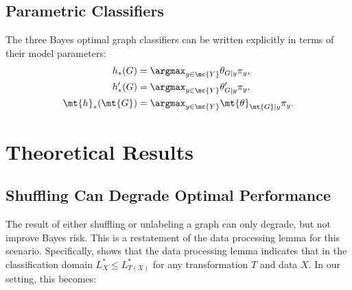\documentclass[10pt,journal,cspaper,compsoc]{IEEEtran}
\begin{document}

\subsection{Parametric Classifiers} %
\label{sub:parametric_classifiers}


The three Bayes optimal graph classifiers can be written explicitly in terms of their model parameters:
\begin{align}
	h_*(G) &= \argmax_{y \in \mc{Y}} \theta_{G|y}\pi_y, \\
	h_*'(G) &= \argmax_{y \in \mc{Y}} \theta_{G|y}' \pi_y, \\
	\mt{h}_*(\mt{G}) &= \argmax_{y \in \mc{Y}}  \mt{\theta}_{\mt{G}|y}\pi_y. \label{eq:unbayes2}
\end{align}




\section{Theoretical Results} %
\label{sec:theoretical_results}

\subsection{Shuffling Can Degrade Optimal Performance} %
\label{sec:shuffle}





The result of either shuffling or unlabeling a graph can only degrade, but not improve Bayes risk.  This is a restatement of the data processing lemma for this scenario. Specifically, \cite{Devroye1996} shows that the data processing lemma indicates that in the classification domain $L^*_X \leq L^*_{T(X)}$ for any transformation $T$ and data $X$.  In our setting, this becomes:
\end{document}
